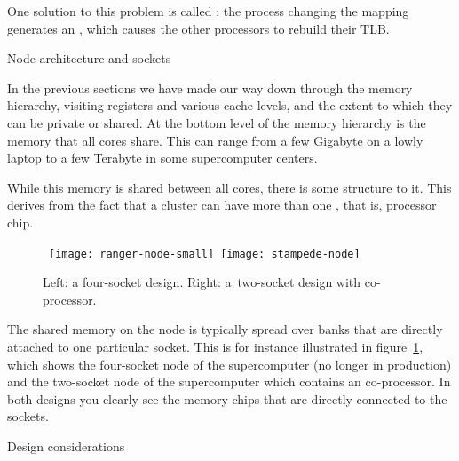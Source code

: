 One solution to this problem is called :
the process changing the mapping generates an
, which causes the other
processors to rebuild their TLB.


 {Node architecture and sockets}
\label{sec:socket}

In the previous sections we have made our way down through the memory
hierarchy, visiting registers and various cache levels, and the extent
to which they can be private or shared. At the bottom level of the
memory hierarchy is the memory that all cores share. This can range
from a few Gigabyte on a lowly laptop to a few Terabyte in some
supercomputer centers. 

While this memory is shared between all cores, there is some structure
to it. This derives from the fact that a cluster  can
have more than one , that is, processor chip.
\begin{figure}[ht]
  \hbox{
    \texttt{[image: ranger-node-small]}
    \texttt{[image: stampede-node]}
    }
  \caption{Left: a four-socket design. Right: a~two-socket design with co-processor.}
  \label{fig:stampede-node}
\end{figure}
The shared memory on the node is typically spread over banks that are
directly attached to one particular socket.
This is for instance illustrated in figure~\ref{fig:stampede-node},
which shows the four-socket node of the 
supercomputer (no longer in production) and the two-socket node of the
supercomputer which contains an 
co-processor.
In both designs you clearly see the memory chips that are directly
connected to the sockets.

 {Design considerations}

